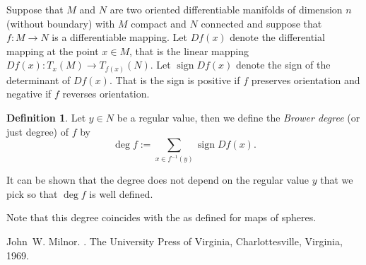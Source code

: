 \documentclass[12pt]{article}
\theoremstyle{theorem}
\theoremstyle{definition}
\newtheorem*{defn}{Definition}
\begin{document}
Suppose that $M$ and $N$ are two oriented differentiable manifolds
of dimension $n$ (without boundary) with $M$ compact and $N$ connected and suppose that
$f \colon M \to N$ is a differentiable mapping.  Let $Df(x)$ denote the
differential mapping at the point $x \in M$,
that is the linear mapping $Df(x) \colon T_x(M) \to T_{f(x)}(N)$.  Let $\operatorname{sign} Df(x)$ denote the sign
of the determinant of $Df(x)$.  That is the sign is positive if $f$ preserves
orientation and negative if $f$ reverses orientation.

\begin{defn}
Let $y \in N$ be a regular value, then we define the {\em Brower degree} (or just
degree) of $f$ by
\begin{equation*}
\operatorname{deg} f := \sum_{x \in f^{-1}(y)} \operatorname{sign} Df(x) .
\end{equation*}
\end{defn}

It can be shown that the degree does not depend on the regular value $y$ that we pick so that $\operatorname{deg} f$ is well defined.

Note that this degree coincides with the  as defined for maps of spheres.

\begin{thebibliography}{9}
John~W. Milnor.
{\em {}}.
The University Press of Virginia, Charlottesville, Virginia, 1969.
\end{thebibliography}
\end{document}
